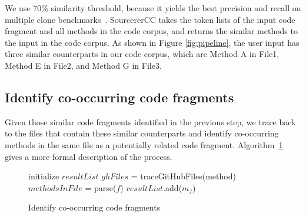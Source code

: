 We use 70\% similarity threshold, because it yields the best precision and recall on multiple clone benchmarks~\cite{sajnani2016sourcerercc}. SourcererCC takes the token lists of the input code fragment and all methods in the code corpus, and returns the similar methods to the input in the code corpus. As shown in Figure \ref{fig:pipeline}, the user input has three similar counterparts in our code corpus, which are {\ttt Method A} in {\ttt File1}, {\ttt Method E} in {\ttt File2}, and {\ttt Method G} in {\ttt File3}.

\subsection{Identify co-occurring code fragments}
Given those similar code fragments identified in the previous step, we trace back to the files that contain these similar counterparts and identify co-occurring methods in the same file as a potentially related code fragment. Algorithm~\ref{alg: co-occur} gives a more formal description of the process.

\begin{figure}[h]
		
 \removelatexerror
\begin{algorithm}[H]
	\label{alg: co-occur}
	\caption{Identify co-occurring code fragments}
	initialize $resultList$\;
	{
		$ghFiles$ = traceGitHubFiles(method) \;
		{
			$methodsInFile$ = parse($f$)\;
			{
				{
					$resultList$.add($m_f$) \;
				}
			}
		} 
	}
\end{algorithm}
\end{figure}

